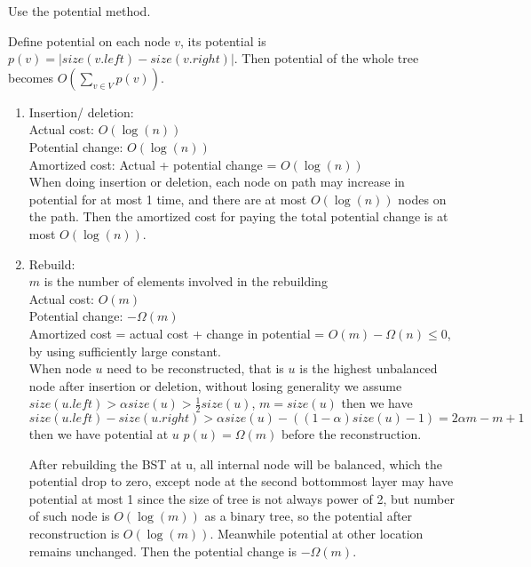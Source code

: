 \documentclass[12pt]{article}
\begin{document}
Use the potential method.

Define potential on each node $v$, its potential is $p(v) = |size(v.left) - size(v.right)|$.
Then potential of the whole tree becomes $O(\sum_{v\in V}p(v))$.\\

\begin{enumerate}

\item{Insertion/ deletion:}\\
Actual cost: $O(\log(n))$\\
Potential change: $O(\log(n))$\\
Amortized cost: Actual + potential change = $O(\log(n))$\\


When doing insertion or deletion, each node on path may increase in potential for at most 1 time,
and there are at most $O(\log(n))$ nodes on the path.
Then the amortized cost for paying the total potential change is at most $O(\log(n))$.\\


\item{Rebuild:}\\
$m$ is the number of elements involved in the rebuilding\\
Actual cost: $O(m)$\\
Potential change: $-\Omega(m)$\\
Amortized cost = actual cost + change in potential = $O(m) - \Omega(n) \le 0$,\\
by using sufficiently large constant.\\


When node $u$ need to be reconstructed,
that is $u$ is the highest unbalanced node after insertion or deletion,
without losing generality we assume $size(u.left) > \alpha size(u) > \frac{1}{2} size(u)$,
$ m = size(u) $
then we have
$$
size(u.left) - size(u.right) > \alpha size(u) - ((1-\alpha)size(u) - 1) = 2\alpha m - m +1
$$
then we have potential at $u$ $p(u) = \Omega(m)$ before the reconstruction.

After rebuilding the BST at u, all internal node will be balanced,
which the potential drop to zero,
except node at the second bottommost layer may have potential at most 1 since the size of tree is not always power of 2,
but number of such node is $O(\log(m))$ as a binary tree,
so the potential after reconstruction is $O(\log(m))$.
Meanwhile potential at other location remains unchanged.
Then the potential change is $-\Omega(m)$.
\end{enumerate}
\end{document}
